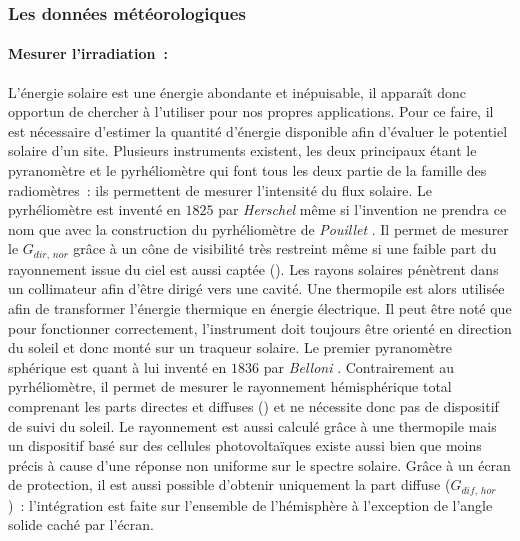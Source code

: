 \subsubsection{Les données météorologiques} %
\label{ssub:les_donnees_meteorologiques}
\paragraph{Mesurer l’irradiation~:} %
\label{par:mesurer_l_irradiation_}
L’énergie solaire est une énergie abondante et inépuisable, il apparaît donc opportun
de chercher à l’utiliser pour nos propres applications. Pour ce faire, il est nécessaire
d’estimer la quantité d’énergie disponible afin d’évaluer le potentiel solaire d’un site.
Plusieurs instruments existent, les deux principaux étant le pyranomètre et le
pyrhéliomètre qui font tous les deux partie de la famille des radiomètres~: ils permettent
de mesurer l’intensité du flux solaire. Le pyrhéliomètre est inventé en $1825$ par
\textit{Herschel} \parencite{Kutz2013} même si l’invention ne prendra ce nom que avec la
construction du pyrhéliomètre de \textit{Pouillet} \parencite{Boer1985}. Il permet de
mesurer le $G_{dir,\,nor}$ grâce à un cône de visibilité très restreint même si une faible
part du rayonnement issue du ciel est aussi captée ().
Les rayons solaires pénètrent dans un collimateur afin d’être dirigé vers une cavité. Une
thermopile est alors utilisée afin de transformer l’énergie thermique en énergie
électrique. Il peut être noté que pour fonctionner correctement, l’instrument doit
toujours être orienté en direction du soleil et donc monté sur un traqueur solaire. Le
premier pyranomètre sphérique est quant à lui inventé en $1836$ par \textit{Belloni}
\parencite{Boer1985}. Contrairement au pyrhéliomètre, il permet de mesurer le rayonnement
hémisphérique total comprenant les parts directes et diffuses () et ne nécessite donc pas
de dispositif de suivi du soleil. Le rayonnement est aussi calculé grâce à une thermopile
mais un dispositif basé sur des cellules photovoltaïques existe aussi bien que moins
précis à cause d’une réponse non uniforme sur le spectre solaire. Grâce à un écran de
protection, il est aussi possible d’obtenir uniquement la part diffuse ($G_{dif,\,hor}$)~: l’intégration
est faite sur l’ensemble de l’hémisphère à l’exception de l’angle solide caché par
l’écran.

